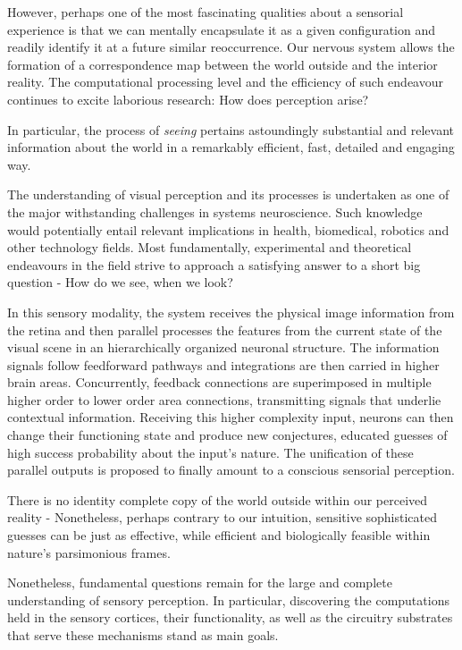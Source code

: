 However, perhaps one of the most fascinating qualities about a sensorial experience is that we can mentally encapsulate it as a given configuration and readily identify it at a future similar reoccurrence. Our nervous system allows the formation of a correspondence map between the world outside and the interior reality. The computational processing level and the efficiency of such endeavour continues to excite laborious research: How does perception arise?

In particular, the process of \textit{seeing} pertains astoundingly substantial and relevant information about the world in a remarkably efficient, fast, detailed and engaging way.

The understanding of visual perception and its processes is undertaken as one of the major withstanding challenges in systems neuroscience. Such knowledge would potentially entail relevant implications in health, biomedical, robotics and other technology fields. Most fundamentally, experimental and theoretical endeavours in the field strive to approach a satisfying answer to a short big question - How do we see, when we look?

In this sensory modality, the system receives the physical image information from the retina and then parallel processes the features from the current state of the visual scene in an hierarchically organized neuronal structure. The information signals follow feedforward pathways and integrations are then carried in higher brain areas. Concurrently, feedback connections are superimposed in multiple higher order to lower order area connections, transmitting signals that underlie contextual information. Receiving this higher complexity input, neurons can then change their functioning state and produce new conjectures, educated guesses of high success probability about the input's nature. 
The unification of these parallel outputs is proposed to finally amount to a conscious sensorial perception.

There is no identity complete copy of the world outside within our perceived reality - Nonetheless, perhaps contrary to our intuition, sensitive sophisticated guesses can be just as effective, while efficient and biologically feasible within nature's parsimonious frames.

Nonetheless, fundamental questions remain for the large and complete understanding of sensory perception. In particular, discovering the computations held in the sensory cortices, their functionality, as well as the circuitry substrates that serve these mechanisms stand as main goals.

